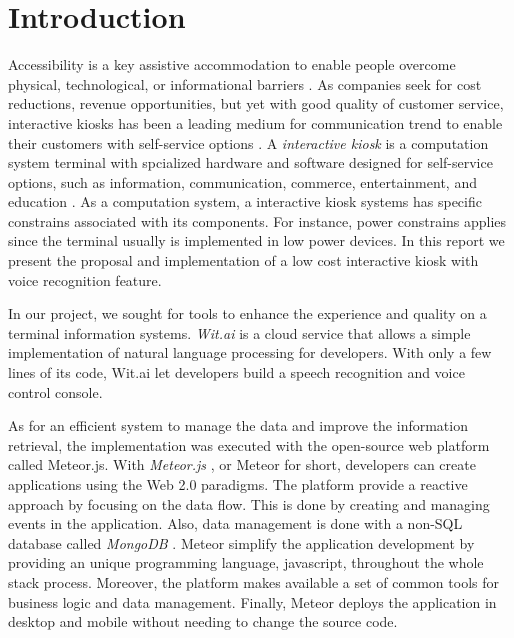 %
\chapter{Introduction}
\label{sec:intro}


Accessibility is a key assistive accommodation to enable people  overcome physical, technological, or informational barriers \cite{acessguide13}.
As companies seek for cost reductions, revenue opportunities, but yet with good quality of customer service, interactive kiosks has been a leading  medium for communication trend to enable their customers with self-service options \cite{abi16}.
A \emph{interactive kiosk} is a computation system terminal with spcialized hardware and software designed for self-service options, such as information, communication, commerce, entertainment, and education \cite{satish2012money}.
As a computation system, a interactive kiosk systems has specific constrains associated with its components.
For instance, power constrains applies since the terminal usually is implemented in low power devices.
In this report we present the proposal and implementation of a low cost interactive kiosk with voice recognition feature.


In our project, we sought for tools to enhance the experience and quality on a terminal information systems.
\emph{Wit.ai} \cite{1_wit.ai_2016} is a cloud service that allows a simple implementation of natural language processing for developers.
With only a few lines of its code, Wit.ai let developers build a speech recognition and voice control console.


As for an efficient system to manage the data and improve the information retrieval, the implementation was executed with the open-source web platform called Meteor.js.
With \emph{Meteor.js} \cite{meteor}, or Meteor for short, developers can create applications using the Web 2.0 paradigms.
The platform provide a reactive approach by focusing on the data flow.
This is done by creating and managing events in the application.
Also, data management is done with a non-SQL database called \emph{MongoDB} \cite{mongo}.
Meteor simplify the application development by providing an unique programming language, javascript, throughout the whole stack process.
Moreover, the platform makes available a set of common tools for business logic and data management.
Finally, Meteor deploys the application in desktop and mobile without needing to change the source code.


